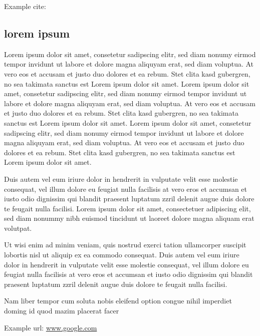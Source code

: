 \documentclass[12pt]{amsart}
\theoremstyle{plain}
\theoremstyle{definition}
\theoremstyle{remark}
\numberwithin{equation}{theorem}
\begin{document}
Example cite: \cite{test}\\

\subsection{lorem ipsum}
Lorem ipsum dolor sit amet, consetetur sadipscing elitr, sed diam nonumy eirmod tempor invidunt ut labore et dolore magna aliquyam erat, sed diam voluptua. At vero eos et accusam et justo duo dolores et ea rebum. Stet clita kasd gubergren, no sea takimata sanctus est Lorem ipsum dolor sit amet. Lorem ipsum dolor sit amet, consetetur sadipscing elitr, sed diam nonumy eirmod tempor invidunt ut labore et dolore magna aliquyam erat, sed diam voluptua. At vero eos et accusam et justo duo dolores et ea rebum. Stet clita kasd gubergren, no sea takimata sanctus est Lorem ipsum dolor sit amet. Lorem ipsum dolor sit amet, consetetur sadipscing elitr, sed diam nonumy eirmod tempor invidunt ut labore et dolore magna aliquyam erat, sed diam voluptua. At vero eos et accusam et justo duo dolores et ea rebum. Stet clita kasd gubergren, no sea takimata sanctus est Lorem ipsum dolor sit amet.

Duis autem vel eum iriure dolor in hendrerit in vulputate velit esse molestie consequat, vel illum dolore eu feugiat nulla facilisis at vero eros et accumsan et iusto odio dignissim qui blandit praesent luptatum zzril delenit augue duis dolore te feugait nulla facilisi. Lorem ipsum dolor sit amet, consectetuer adipiscing elit, sed diam nonummy nibh euismod tincidunt ut laoreet dolore magna aliquam erat volutpat.

Ut wisi enim ad minim veniam, quis nostrud exerci tation ullamcorper suscipit lobortis nisl ut aliquip ex ea commodo consequat. Duis autem vel eum iriure dolor in hendrerit in vulputate velit esse molestie consequat, vel illum dolore eu feugiat nulla facilisis at vero eros et accumsan et iusto odio dignissim qui blandit praesent luptatum zzril delenit augue duis dolore te feugait nulla facilisi.

Nam liber tempor cum soluta nobis eleifend option congue nihil imperdiet doming id quod mazim placerat facer

\begin{thebibliography}{999}

Example url: \url{www.google.com}

\end{thebibliography}
\end{document}
